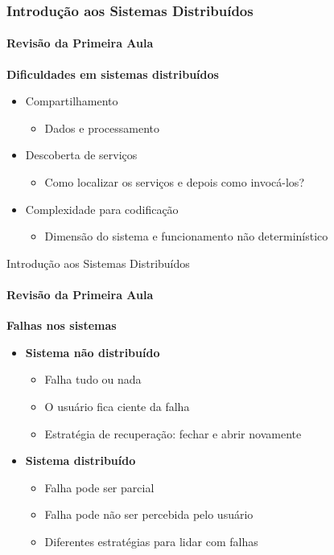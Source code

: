 \documentclass[hyperref={pdfpagelabels=false},table]{beamer}
\begin{document}
\begin{frame}[wide]
	\frametitle{Introdução aos Sistemas Distribuídos}
	\framesubtitle{Revisão da Primeira Aula}
	\textbf{Dificuldades em sistemas distribuídos}
		\begin{itemize}
			\item Compartilhamento
			\begin{itemize}
				\item Dados e processamento
			\end{itemize}
			\item Descoberta de serviços
			\begin{itemize}
				\item Como localizar os serviços e depois como invocá-los?
			\end{itemize}
			\item Complexidade para codificação
			\begin{itemize}
				\item Dimensão do sistema e funcionamento não determinístico
			\end{itemize}
		\end{itemize}
\end{frame}

\begin{frame}[wide]{Introdução aos Sistemas Distribuídos}
	\framesubtitle{Revisão da Primeira Aula}
	\textbf{Falhas nos sistemas}
		\begin{itemize}
			\item \textbf{Sistema não distribuído}
			\begin{itemize}
				\item Falha tudo ou nada
				\item O usuário fica ciente da falha
				\item Estratégia de recuperação: fechar e abrir novamente
			\end{itemize}
			\item \textbf{Sistema distribuído}
			\begin{itemize}
				\item Falha pode ser parcial
				\item Falha pode não ser percebida pelo usuário
				\item Diferentes estratégias para lidar com falhas
			\end{itemize}
	\end{itemize}
\end{frame}




\end{document}

